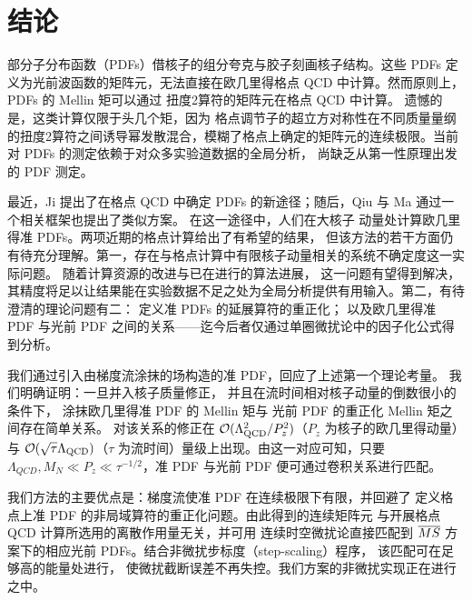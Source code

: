 \section{\label{sec:concs}结论}

部分子分布函数（PDFs）借核子的组分夸克与胶子刻画核子结构。这些 PDFs 定义为光前波函数的矩阵元，无法直接在欧几里得格点 QCD 中计算。然而原则上，PDFs 的 Mellin 矩可以通过
扭度2算符的矩阵元在格点 QCD 中计算。
遗憾的是，这类计算仅限于头几个矩，因为
格点调节子的超立方对称性在不同质量量纲的扭度2算符之间诱导幂发散混合，模糊了格点上确定的矩阵元的连续极限。当前对 PDFs 的测定依赖于对众多实验道数据的全局分析，
尚缺乏从第一性原理出发的 PDF 测定。

最近，Ji 提出了在格点 QCD 中确定 PDFs 的新途径；随后，Qiu 与 Ma 通过一个相关框架也提出了类似方案。
在这一途径中，人们在大核子
动量处计算欧几里得准 PDFs。两项近期的格点计算给出了有希望的结果，
但该方法的若干方面仍有待充分理解。第一，存在与格点计算中有限核子动量相关的系统不确定度这一实际问题。
随着计算资源的改进与已在进行的算法进展，
这一问题有望得到解决，其精度将足以让结果能在实验数据不足之处为全局分析提供有用输入。第二，有待澄清的理论问题有二：
定义准 PDFs 的延展算符的重正化；
以及欧几里得准 PDF 与光前 PDF 之间的关系——迄今后者仅通过单圈微扰论中的因子化公式得到分析。

我们通过引入由梯度流涂抹的场构造的准 PDF，回应了上述第一个理论考量。
我们明确证明：一旦并入核子质量修正，
并且在流时间相对核子动量的倒数很小的条件下，
涂抹欧几里得准 PDF 的 Mellin 矩与
光前 PDF 的重正化 Mellin 矩之间存在简单关系。
对该关系的修正在 ${\cal O}(\Lambda_{\mathrm{QCD}}^2/P_z^2)$（$P_z$ 为核子的欧几里得动量）与 ${\cal O}(\sqrt{\tau} \Lambda_{\mathrm{QCD}})$（$\tau$ 为流时间）量级上出现。由这一对应可知，只要
$\Lambda_{QCD},M_N\ll P_z \ll \tau^{-1/2}$，准 PDF 与光前 PDF
便可通过卷积关系进行匹配。

我们方法的主要优点是：梯度流使准
PDF 在连续极限下有限，并回避了
定义格点上准 PDF 的非局域算符的重正化问题。由此得到的连续矩阵元
与开展格点 QCD 计算所选用的离散作用量无关，并可用
连续时空微扰论直接匹配到 $\overline{MS}$ 方案下的相应光前 PDFs。结合非微扰步标度（step-scaling）程序，
该匹配可在足够高的能量处进行，
使微扰截断误差不再失控。我们方案的非微扰实现正在进行之中。


